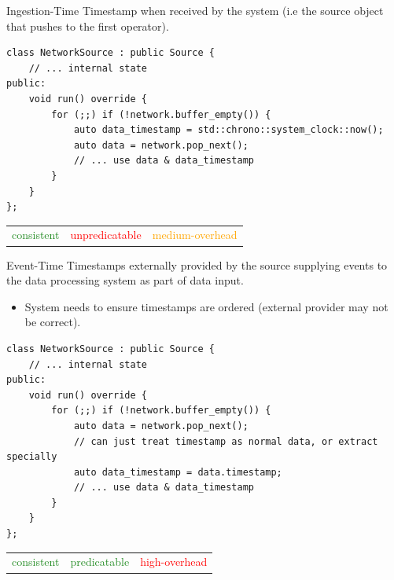 \begin{definitionbox}{Ingestion-Time}
    Timestamp when received by the system (i.e the source object that pushes to the first operator).
    \begin{verbatim}
class NetworkSource : public Source {
    // ... internal state
public:
    void run() override {
        for (;;) if (!network.buffer_empty()) {
            auto data_timestamp = std::chrono::system_clock::now();
            auto data = network.pop_next();
            // ... use data & data_timestamp
        }
    }
};
    \end{verbatim}
    \begin{center}
        \begin{tabular}{c | c | c}
            \textcolor{ForestGreen}{consistent} & \textcolor{red}{unpredicatable} & \textcolor{orange}{medium-overhead} \\
        \end{tabular}
    \end{center}
\end{definitionbox}
\begin{definitionbox}{Event-Time}
    Timestamps externally provided by the source supplying events to the data processing system as part of data input.
    \begin{itemize}
        \item System needs to ensure timestamps are ordered (external provider may not be correct).
    \end{itemize}
    \begin{verbatim}
class NetworkSource : public Source {
    // ... internal state
public:
    void run() override {
        for (;;) if (!network.buffer_empty()) {
            auto data = network.pop_next();
            // can just treat timestamp as normal data, or extract specially
            auto data_timestamp = data.timestamp;
            // ... use data & data_timestamp
        }
    }
};
    \end{verbatim}
    \begin{center}
        \begin{tabular}{c | c | c}
            \textcolor{ForestGreen}{consistent} & \textcolor{ForestGreen}{predicatable} & \textcolor{red}{high-overhead} \\
        \end{tabular}
    \end{center}
\end{definitionbox}

